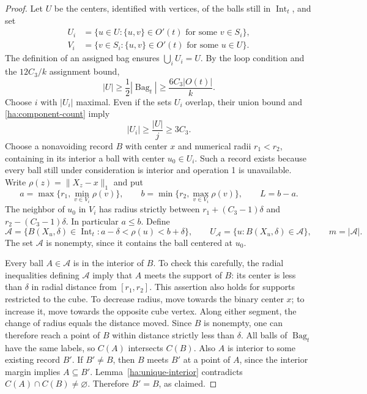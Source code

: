 \documentclass[11pt]{amsart}
\theoremstyle{definition}
\theoremstyle{remark}
\numberwithin{equation}{section}
\begin{document}
\begin{proof}
Let $U$ be the centers, identified with vertices, of the balls still
in $\operatorname{Int}_t$, and set
\[
 \begin{split}
 U_i&=\{u\in U:\{u,v\}\in O'(t)\text{ for some }v\in S_i\},\\
 V_i&=\{v\in S_i:\{u,v\}\in O'(t)\text{ for some }u\in U\}.
 \end{split}
\]
The definition of an assigned bag ensures $\bigcup_iU_i=U$.
By the loop condition and the $12C_3/k$ assignment bound,
\[
 |U|\geq\frac12|\operatorname{Bag}_t|
       \geq\frac{6C_3|O(t)|}{k}.
\]
Choose $i$ with $|U_i|$ maximal.  Even if the sets $U_i$ overlap,
their union bound and \eqref{ha:component-count} imply
\begin{equation}
 |U_i|\geq\frac{|U|}{j}\geq3C_3.
 \label{ha:many-neighbors}
\end{equation}
Choose a nonavoiding record $B$ with center $x$ and numerical radii
$r_1<r_2$, containing in its interior a ball with center $u_0\in U_i$.
Such a record exists because
every ball still under consideration is interior and operation 1 is
unavailable.  Write $\rho(z)=\|X_z-x\|_1$ and put
\begin{equation}
 a=\max\{r_1,\min_{v\in V_i}\rho(v)\},\qquad
 b=\min\{r_2,\max_{v\in V_i}\rho(v)\},\qquad L=b-a.
 \label{ha:radial-endpoints}
\end{equation}
The neighbor of $u_0$ in $V_i$ has radius strictly between
$r_1+(C_3-1)\delta$ and $r_2-(C_3-1)\delta$.  In particular $a\leq b$.
Define
\[
 \mathcal A=
 \{B(X_u,\delta)\in\operatorname{Int}_t:
                a-\delta<\rho(u)<b+\delta\},
 \qquad U_{\mathcal A}=\{u:B(X_u,\delta)\in\mathcal A\},
 \qquad m=|\mathcal A|.
\]
The set $\mathcal A$ is nonempty, since it contains the ball centered
at $u_0$.

Every ball $A\in\mathcal A$ is in the interior of $B$.  To check this
carefully, the radial inequalities defining $\mathcal A$ imply that
$A$ meets the support of $B$: its center is less than $\delta$ in
radial distance from $[r_1,r_2]$.  This assertion also holds for supports
restricted to the cube.  To decrease radius, move towards the binary
center $x$; to increase it, move towards the opposite cube vertex.
Along either segment, the change of radius equals the distance moved.
Since $B$ is nonempty, one can therefore reach a point of $B$ within
distance strictly less than $\delta$.  All balls of $\operatorname{Bag}_t$
have the same labels, so $C(A)$ intersects $C(B)$.  Also $A$ is
interior to some existing record $B'$.  If $B'\ne B$, then $B$ meets
$B'$ at a point of $A$, since the interior margin implies $A\subseteq
B'$.  Lemma~\ref{ha:unique-interior} contradicts
$C(A)\cap C(B)\ne\varnothing$.  Therefore $B'=B$, as claimed.


\end{proof}
\end{document}
